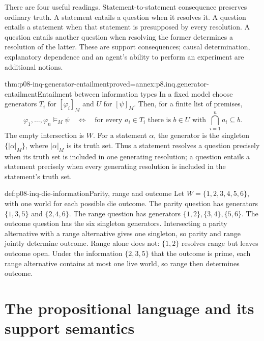 There are four useful readings. Statement-to-statement consequence preserves
ordinary truth. A statement entails a question when it resolves it. A
question entails a statement when that statement is presupposed by every
resolution. A question entails another question when resolving the former
determines a resolution of the latter. These are support consequences;
causal determination, explanatory dependence and an agent's ability to
perform an experiment are additional notions.

\begin{hblemma}{thm:p08-inq-generator-entailment}{proved=annex:p8.inq.generator-entailment}{Entailment between information types}
In a fixed model choose generators \(T_i\) for \([\varphi_i]_M\) and \(U\)
for \([\psi]_M\). Then, for a finite list of premises,
\[
 \varphi_1,\ldots,\varphi_n\models_M\psi
 \quad\Longleftrightarrow\quad
 \text{for every }a_i\in T_i\text{ there is }b\in U
 \text{ with }\bigcap_{i=1}^n a_i\subseteq b.
\]
The empty intersection is \(W\). For a statement \(\alpha\), the generator
is the singleton \(\{|\alpha|_M\}\), where \(|\alpha|_M\) is its truth set.
Thus a statement resolves a question precisely when its truth set is included
in one generating resolution; a question entails a statement precisely when
every generating resolution is included in the statement's truth set.
\end{hblemma}

\begin{hbexample}{def:p08-inq-die-information}{Parity, range and outcome}
Let \(W=\{1,2,3,4,5,6\}\), with one world for each possible die outcome.
The parity question has generators \(\{1,3,5\}\) and \(\{2,4,6\}\).
The range question has generators \(\{1,2\},\{3,4\},\{5,6\}\).
The outcome question has the six singleton generators. Intersecting a parity
alternative with a range alternative gives one singleton, so parity and range
jointly determine outcome. Range alone does not: \(\{1,2\}\) resolves range
but leaves outcome open. Under the information \(\{2,3,5\}\) that the outcome
is prime, each range alternative contains at most one live world, so range
then determines outcome.
\end{hbexample}

\section{The propositional language and its support semantics}

